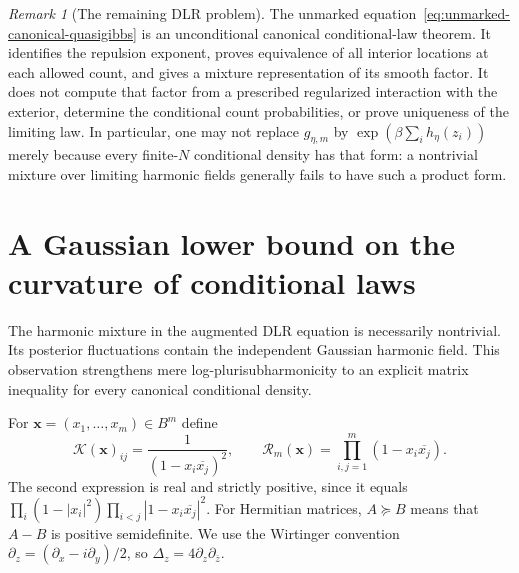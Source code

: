 \documentclass[11pt,a4paper]{article}
\numberwithin{equation}{section}
\theoremstyle{definition}
\theoremstyle{remark}
\newtheorem{remark}[theorem]{Remark}
\begin{document}
\begin{remark}[The remaining DLR problem]
The unmarked equation~\eqref{eq:unmarked-canonical-quasigibbs} is an
unconditional canonical conditional-law theorem. It identifies the
repulsion exponent, proves equivalence of all interior locations at
each allowed count, and gives a mixture representation of its smooth
factor. It does not compute that factor from a prescribed regularized
interaction with the exterior, determine the conditional count
probabilities, or prove uniqueness of the limiting law. In particular,
one may not replace $g_{\eta,m}$ by
$\exp(\beta\sum_i h_\eta(z_i))$ merely because every finite-$N$
conditional density has that form: a nontrivial mixture over limiting
harmonic fields generally fails to have such a product form.
\end{remark}

\section{A Gaussian lower bound on the curvature of conditional laws}
\label{sec:conditional-gaussian-curvature}

The harmonic mixture in the augmented DLR equation is necessarily
nontrivial. Its posterior fluctuations contain the independent Gaussian
harmonic field. This observation strengthens mere
log-plurisubharmonicity to an explicit matrix inequality for every
canonical conditional density.

For $\mathbf x=(x_1,\ldots,x_m)\in B^m$ define
\[
 \mathcal K(\mathbf x)_{ij}=\frac1{(1-x_i\overline{x_j})^2},
 \qquad
 \mathcal R_m(\mathbf x)=\prod_{i,j=1}^m(1-x_i\overline{x_j}).
\]
The second expression is real and strictly positive, since it equals
$\prod_i(1-|x_i|^2)\prod_{i<j}|1-x_i\overline{x_j}|^2$.
For Hermitian matrices, $A\succeq B$ means that $A-B$ is positive
semidefinite. We use the Wirtinger convention
$\partial_z=(\partial_x-i\partial_y)/2$, so
$\Delta_z=4\partial_z\partial_{\bar z}$.
\end{document}
